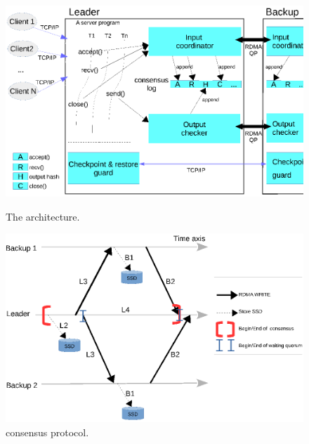 
\begin{figure}[!htb]
    \begin{minipage}{.4\textwidth}
        \vspace{-.2in}
        \includegraphics[width=0.34\textheight]{figures/arch.ps}
        \vspace{-.4in}         
        \caption{The \falcon architecture.}
        \label{fig:falcon-arch}
    \end{minipage}
    \begin{minipage}{0.4\textwidth}
        \vspace{-.2in}
        \includegraphics[width=0.34\textheight]{figures/consensus.ps}
        \vspace{-.4in}
        \caption{\falcon consensus protocol.}
        \label{fig:falcon-protocol}
    \end{minipage}
\end{figure}

